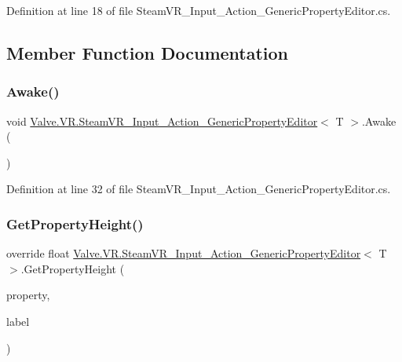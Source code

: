 Definition at line 18 of file Steam\+V\+R\+\_\+\+Input\+\_\+\+Action\+\_\+\+Generic\+Property\+Editor.\+cs.



\subsection{Member Function Documentation}
\mbox{\label{class_valve_1_1_v_r_1_1_steam_v_r___input___action___generic_property_editor_abed3282b52020f3aed9ac0a45ccc7d31}} 
\subsubsection{\texorpdfstring{Awake()}{Awake()}}
{\footnotesize\ttfamily void \mbox{\hyperlink{class_valve_1_1_v_r_1_1_steam_v_r___input___action___generic_property_editor}{Valve.\+V\+R.\+Steam\+V\+R\+\_\+\+Input\+\_\+\+Action\+\_\+\+Generic\+Property\+Editor}}$<$ T $>$.Awake (\begin{DoxyParamCaption}{ }\end{DoxyParamCaption})\hspace{0.3cm}{\ttfamily [protected]}}



Definition at line 32 of file Steam\+V\+R\+\_\+\+Input\+\_\+\+Action\+\_\+\+Generic\+Property\+Editor.\+cs.

\mbox{\label{class_valve_1_1_v_r_1_1_steam_v_r___input___action___generic_property_editor_ab201369606d4e98797306901633e6f2a}} 
\subsubsection{\texorpdfstring{GetPropertyHeight()}{GetPropertyHeight()}}
{\footnotesize\ttfamily override float \mbox{\hyperlink{class_valve_1_1_v_r_1_1_steam_v_r___input___action___generic_property_editor}{Valve.\+V\+R.\+Steam\+V\+R\+\_\+\+Input\+\_\+\+Action\+\_\+\+Generic\+Property\+Editor}}$<$ T $>$.Get\+Property\+Height (\begin{DoxyParamCaption}\item[{Serialized\+Property}]{property,  }\item[{G\+U\+I\+Content}]{label }\end{DoxyParamCaption})}



